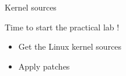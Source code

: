 \setuplabframe
{Kernel sources}
{
  Time to start the practical lab !
  \begin{itemize}
  \item Get the Linux kernel sources
  \item Apply patches
  \end{itemize}
}
